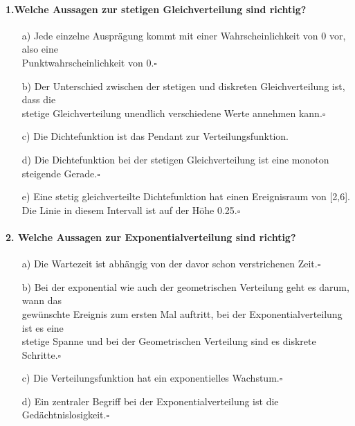 \documentclass[a4paper]{article}
\begin{document}
\paragraph{1.Welche Aussagen zur stetigen Gleichverteilung sind richtig?}
\begin{itemize}
    \item[a)]Jede einzelne Ausprägung kommt mit einer Wahrscheinlichkeit von 0 vor, also eine\\ Punktwahrscheinlichkeit von 0.\hfill $\square$
    \item[b)]Der Unterschied zwischen der stetigen und diskreten Gleichverteilung ist, dass die\\ stetige Gleichverteilung unendlich verschiedene Werte annehmen kann.\hfill $\square$
    \item[c)]Die Dichtefunktion ist das Pendant zur Verteilungsfunktion.
    \item[d)]Die Dichtefunktion bei der stetigen Gleichverteilung ist eine monoton steigende Gerade.\hfill $\square$
    \item[e)]Eine stetig gleichverteilte Dichtefunktion hat einen Ereignisraum von [2,6]. \\Die Linie in diesem Intervall ist auf der Höhe 0.25.\hfill $\square$
\end{itemize}

\paragraph{2. Welche Aussagen zur Exponentialverteilung sind richtig?}
\begin{itemize}
    \item[a)]Die Wartezeit ist abhängig von der davor schon verstrichenen Zeit.\hfill $\square$
    \item[b)]Bei der exponential wie auch der geometrischen Verteilung geht es darum, wann das\\ gewünschte Ereignis zum ersten Mal auftritt, bei der Exponentialverteilung ist es eine\\ stetige Spanne und bei der Geometrischen Verteilung sind es diskrete Schritte.\hfill $\square$
    \item[c)]Die Verteilungsfunktion hat ein exponentielles Wachstum.\hfill $\square$
    \item[d)]Ein zentraler Begriff bei der Exponentialverteilung ist die Gedächtnislosigkeit.\hfill $\square$
\end{itemize}
\end{document}
